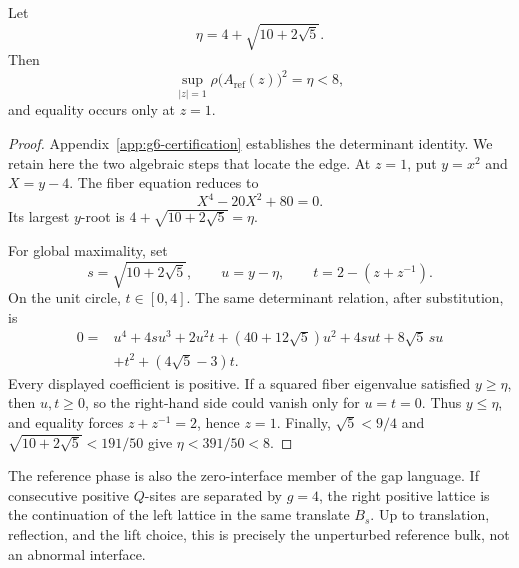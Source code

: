 \begin{proposition}\label{prop:reference-edge}
Let
\[
\eta=4+\sqrt{10+2\sqrt5}.
\]
Then
\[
\sup_{|z|=1}\rho\bigl(A_{\mathrm{ref}}(z)\bigr)^2=\eta<8,
\]
and equality occurs only at \(z=1\).
\end{proposition}

\begin{proof}
Appendix~\ref{app:g6-certification} establishes the determinant identity.
We retain here the two algebraic steps
that locate the edge.  At \(z=1\), put \(y=x^2\) and \(X=y-4\).  The fiber
equation reduces to
\[
X^4-20X^2+80=0.
\]
Its largest \(y\)-root is
\(4+\sqrt{10+2\sqrt5}=\eta\).

For global maximality, set
\[
s=\sqrt{10+2\sqrt5},\qquad u=y-\eta,\qquad
t=2-(z+z^{-1}).
\]
On the unit circle, \(t\in[0,4]\). The same determinant relation,
after substitution, is
\begin{align*}
0={}&u^4+4su^3+2u^2t+(40+12\sqrt5)u^2
+4sut+8\sqrt5\,su\\
&+t^2+(4\sqrt5-3)t.
\end{align*}
Every displayed coefficient is positive.  If a squared fiber eigenvalue
satisfied \(y\geq\eta\), then \(u,t\geq0\), so the right-hand side could
vanish only for \(u=t=0\).  Thus \(y\leq\eta\), and equality forces
\(z+z^{-1}=2\), hence \(z=1\).  Finally,
\(\sqrt5<9/4\) and
\(\sqrt{10+2\sqrt5}<191/50\) give
\(\eta<391/50<8\).
\end{proof}

The reference phase is also the zero-interface member of the gap language.
If consecutive positive \(Q\)-sites are separated by \(g=4\), the right
positive lattice is the continuation of the left lattice in the same
translate \(B_s\).  Up to translation, reflection, and the lift choice,
this is precisely the unperturbed reference bulk, not an abnormal interface.
